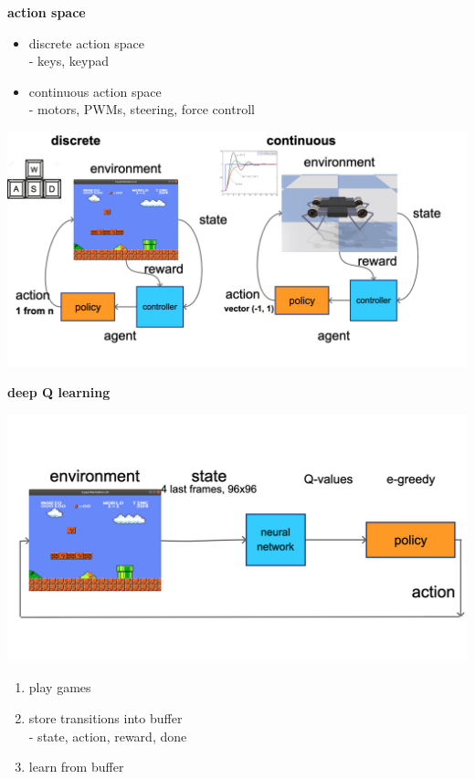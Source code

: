 \documentclass[xcolor=dvipsnames]{beamer}
\begin{document}
\begin{frame}{\bf action space}

  \begin{itemize}
    \item discrete action space \\
      - keys, keypad
    \item continuous action space \\
      - motors, PWMs, steering, force controll
  \end{itemize}

  {\centering \includegraphics[scale=0.15]{../diagrams/basic/actionspace.png}}

\end{frame}


\begin{frame}{\bf deep Q learning}

  {\centering \includegraphics[scale=0.15]{../diagrams/basic/deepqnetwork.png}}

  \begin{enumerate}
    \item play games
    \item store transitions into buffer \\
      - state, action, reward, done
    \item learn from buffer
  \end{enumerate}
\end{frame}
\end{document}
